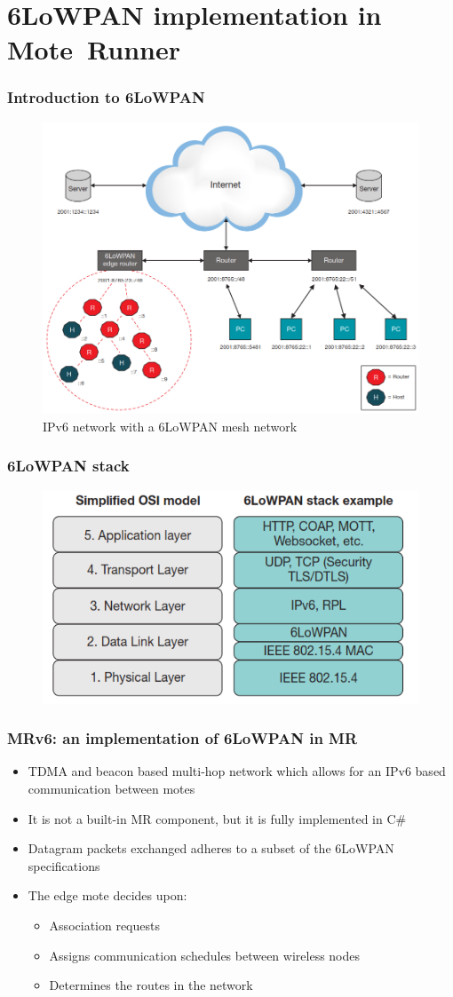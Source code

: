 \section{6LoWPAN implementation in \mbox{Mote Runner}}
\begin{frame}[fragile]
  \frametitle{Introduction to 6LoWPAN}
  \begin{figure}
    \includegraphics[width=.7\textwidth]{img/6low_network.png}
    \caption{IPv6 network with a 6LoWPAN mesh network}
  \end{figure}
\end{frame}

\begin{frame}[fragile]
  \frametitle{6LoWPAN stack}
  \begin{figure}
    \includegraphics[width=.6\textwidth]{img/6low_stack.png}
  \end{figure}
\end{frame}

\begin{frame}[fragile]
  \frametitle{MRv6: an implementation of 6LoWPAN in MR}
  \begin{itemize}
    \item TDMA and beacon based multi-hop network which allows for an IPv6 based communication between motes
    \item It is not a built-in MR component, but it is fully implemented in C\#
    \item Datagram packets exchanged adheres to a subset of the 6LoWPAN specifications
    \item The edge mote decides upon:
    \begin{itemize}
      \item Association requests
      \item Assigns communication schedules between wireless nodes
      \item Determines the routes in the network
    \end{itemize}
  \end{itemize}
\end{frame}

